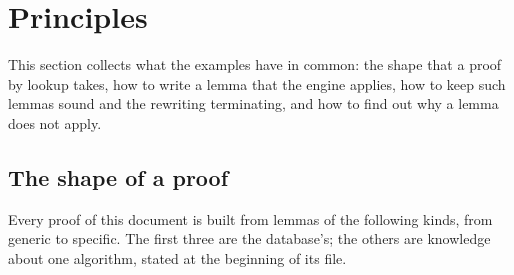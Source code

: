 \section{Principles}\label{sec:principles}

This section collects what the examples have in common: the shape that a proof by lookup takes, how to write a lemma
that the engine applies, how to keep such lemmas sound and the rewriting terminating, and how to find out why a
lemma does not apply.

\subsection{The shape of a proof}\label{sec:principles:shape}
Every proof of this document is built from lemmas of the following kinds, from generic to specific. The first three
are the database's; the others are knowledge about one algorithm, stated at the beginning of its file.
